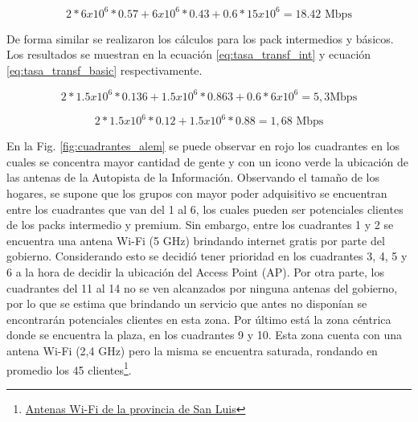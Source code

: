 \documentclass[11pt,a4paper]{article}
\begin{document}
\begin{equation}
  2*6x{10}^6*0.57+6x{10}^6*0.43+0.6*15x{10}^6=18.42 \text{ Mbps}
  \label{eq:tasa_transf_premium}
\end{equation}


De forma similar se realizaron los cálculos para los pack intermedios y básicos. 
Los resultados se muestran en la ecuación \ref{eq:tasa_transf_int} y ecuación \ref{eq:tasa_transf_basic} respectivamente. 


\begin{equation}
 2*1.5x{10}^6*0.136+1.5x{10}^6*0.863+ 0.6*6x{10}^6=5,3 \text{Mbps} 
 \label{eq:tasa_transf_int}
\end{equation}

\begin{equation}
 2*1.5x{10}^6*0.12+1.5x{10}^6*0.88=1,68 \text{ Mbps}
 \label{eq:tasa_transf_basic}
\end{equation}
 

 En la Fig. \ref{fig:cuadrantes_alem} se puede observar en rojo los cuadrantes en los cuales se concentra mayor cantidad de gente y con un icono verde la ubicación de las antenas de la Autopista de la Información. 
 Observando el tamaño de los hogares, se supone que los grupos con mayor poder adquisitivo se encuentran entre los cuadrantes que van del 1 al 6, los cuales pueden ser potenciales clientes de los packs intermedio y premium. 
 Sin embargo, entre los cuadrantes 1 y 2 se encuentra una antena Wi-Fi (5 GHz) brindando internet gratis por parte del gobierno. 
 Considerando esto se decidió tener prioridad en los cuadrantes 3, 4, 5 y 6 a la hora de decidir la ubicación del Access Point (AP). Por otra parte, los cuadrantes del 11 al 14 no se ven alcanzados por ninguna antenas del gobierno, por lo que se estima que brindando un servicio que antes no disponían se encontrarán potenciales clientes en esta zona. 
 Por último está la zona céntrica donde se encuentra la plaza, en los cuadrantes 9 y 10. Esta zona cuenta con una antena Wi-Fi (2,4 GHz) pero la misma se encuentra saturada, rondando en promedio los 45 clientes\footnote{\href{http://wifi.sanluis.gov.ar/}{Antenas Wi-Fi de la provincia de San Luis}}.
\end{document}
